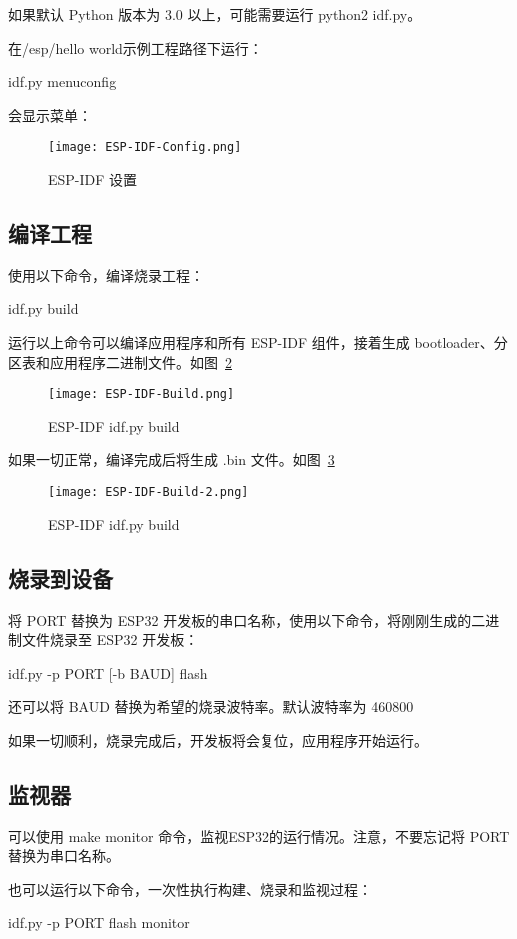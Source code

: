 如果默认 Python 版本为 3.0 以上，可能需要运行 python2 idf.py。


在/esp/hello world示例工程路径下运行：

\begin{tcolorbox}
    idf.py menuconfig
\end{tcolorbox}

会显示菜单：

\begin{figure}[htbp]
    \centering
    \texttt{[image: ESP-IDF-Config.png]}
    \caption{ESP-IDF 设置}
    \label{ESP-IDF-Config}
\end{figure}

\subsection{编译工程}

使用以下命令，编译烧录工程：

\begin{tcolorbox}
    idf.py build
\end{tcolorbox}

运行以上命令可以编译应用程序和所有 ESP-IDF 组件，接着生成 bootloader、分区表和应用程序二进制文件。如图~\ref{fig:ESP-IDF-Build}

\begin{figure}[htbp]
    \centering
    \texttt{[image: ESP-IDF-Build.png]}
    \caption{ESP-IDF idf.py build}
    \label{fig:ESP-IDF-Build}
\end{figure}

如果一切正常，编译完成后将生成 .bin 文件。如图~\ref{fig:ESP-IDF-Build-2}

\begin{figure}[htbp]
    \centering
    \texttt{[image: ESP-IDF-Build-2.png]}
    \caption{ESP-IDF idf.py build}
    \label{fig:ESP-IDF-Build-2}
\end{figure}

\subsection{烧录到设备}

将 PORT 替换为 ESP32 开发板的串口名称，使用以下命令，将刚刚生成的二进制文件烧录至 ESP32 开发板：

\begin{tcolorbox}
    idf.py -p PORT [-b BAUD] flash
\end{tcolorbox}

还可以将 BAUD 替换为希望的烧录波特率。默认波特率为 460800

如果一切顺利，烧录完成后，开发板将会复位，应用程序开始运行。

\subsection{监视器}

可以使用 make monitor 命令，监视ESP32的运行情况。注意，不要忘记将 PORT 替换为串口名称。

也可以运行以下命令，一次性执行构建、烧录和监视过程：

\begin{tcolorbox}
    idf.py -p PORT flash monitor
\end{tcolorbox}
